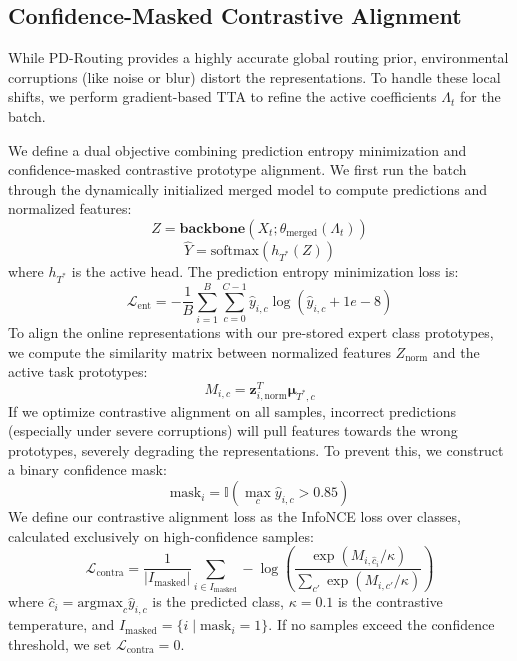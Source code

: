 \documentclass{article}
\theoremstyle{plain}
\theoremstyle{definition}
\theoremstyle{remark}
\begin{document}
\subsection{Confidence-Masked Contrastive Alignment}
While PD-Routing provides a highly accurate global routing prior, environmental corruptions (like noise or blur) distort the representations. To handle these local shifts, we perform gradient-based TTA to refine the active coefficients $\Lambda_t$ for the batch.

We define a dual objective combining prediction entropy minimization and confidence-masked contrastive prototype alignment. We first run the batch through the dynamically initialized merged model to compute predictions and normalized features:
\begin{equation}
    Z = \mathbf{backbone}(X_t; \theta_{\text{merged}}(\Lambda_t))
\end{equation}
\begin{equation}
    \hat{Y} = \text{softmax}(h_{T^*}(Z))
\end{equation}
where $h_{T^*}$ is the active head. The prediction entropy minimization loss is:
\begin{equation}
    \mathcal{L}_{\text{ent}} = - \frac{1}{B} \sum_{i=1}^B \sum_{c=0}^{C-1} \hat{y}_{i, c} \log(\hat{y}_{i, c} + 1e-8)
\end{equation}
To align the online representations with our pre-stored expert class prototypes, we compute the similarity matrix between normalized features $Z_{\text{norm}}$ and the active task prototypes:
\begin{equation}
    M_{i, c} = \mathbf{z}_{i,\text{norm}}^T \mathbf{\mu}_{T^*, c}
\end{equation}
If we optimize contrastive alignment on all samples, incorrect predictions (especially under severe corruptions) will pull features towards the wrong prototypes, severely degrading the representations. To prevent this, we construct a binary confidence mask:
\begin{equation}
    \text{mask}_i = \mathbb{I}\left( \max_{c} \hat{y}_{i, c} > 0.85 \right)
\end{equation}
We define our contrastive alignment loss as the InfoNCE loss over classes, calculated exclusively on high-confidence samples:
\begin{equation}
    \mathcal{L}_{\text{contra}} = \frac{1}{|I_{\text{masked}}|} \sum_{i \in I_{\text{masked}}} -\log \left( \frac{\exp(M_{i, \hat{c}_i} / \kappa)}{\sum_{c'} \exp(M_{i, c'} / \kappa)} \right)
\end{equation}
where $\hat{c}_i = \text{argmax}_{c} \hat{y}_{i, c}$ is the predicted class, $\kappa = 0.1$ is the contrastive temperature, and $I_{\text{masked}} = \{i \mid \text{mask}_i = 1\}$. If no samples exceed the confidence threshold, we set $\mathcal{L}_{\text{contra}} = 0$.
\end{document}

